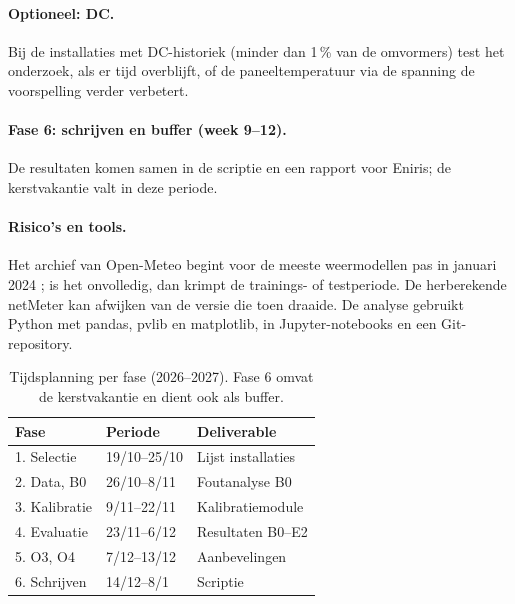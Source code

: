 \paragraph{Optioneel: DC.}
Bij de installaties met DC-historiek (minder dan 1\,\% van de omvormers) test het onderzoek, als er tijd overblijft, of de paneeltemperatuur via de spanning \autocite{Kladas2023} de voorspelling verder verbetert.

\paragraph{Fase 6: schrijven en buffer (week 9--12).}
De resultaten komen samen in de scriptie en een rapport voor Eniris; de kerstvakantie valt in deze periode.

\paragraph{Risico's en tools.}
Het archief van Open-Meteo begint voor de meeste weermodellen pas in januari 2024 \autocite{OpenMeteoPrevRuns}; is het onvolledig, dan krimpt de trainings- of testperiode. De herberekende netMeter kan afwijken van de versie die toen draaide. De analyse gebruikt Python met pandas, pvlib en matplotlib, in Jupyter-notebooks en een Git-repository.

\begin{table}[ht]
  \centering
  \small
  \begin{tabular}{@{}lll@{}}
    \toprule
    \textbf{Fase} & \textbf{Periode} & \textbf{Deliverable} \\
    \midrule
    1. Selectie     & 19/10--25/10 & Lijst installaties \\
    2. Data, B0     & 26/10--8/11  & Foutanalyse B0 \\
    3. Kalibratie   & 9/11--22/11  & Kalibratiemodule \\
    4. Evaluatie    & 23/11--6/12  & Resultaten B0--E2 \\
    5. O3, O4       & 7/12--13/12  & Aanbevelingen \\
    6. Schrijven    & 14/12--8/1   & Scriptie \\
    \bottomrule
  \end{tabular}
  \caption{\label{tab:planning}Tijdsplanning per fase (2026--2027). Fase 6 omvat de kerstvakantie en dient ook als buffer.}
\end{table}

